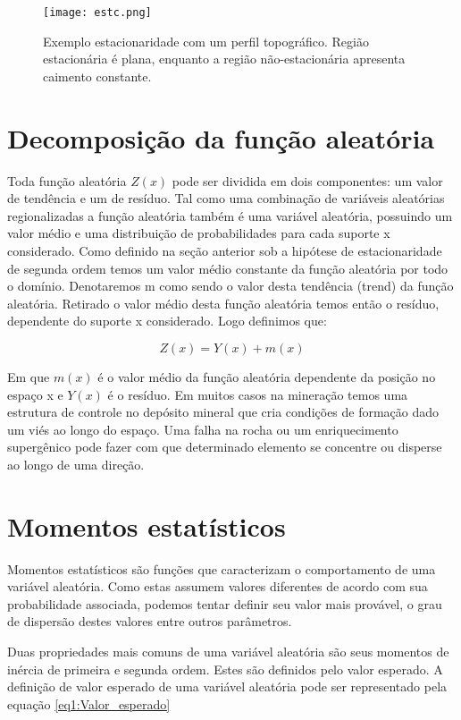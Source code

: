 \begin{figure}
\centering
\texttt{[image: estc.png]}	
\caption{Exemplo estacionaridade com um perfil topográfico. Região estacionária é plana, enquanto a região não-estacionária apresenta caimento constante.}
\label{estc}
\end{figure}

\section{Decomposição da função aleatória} \label{residuo}

Toda função aleatória $Z(x)$ pode ser dividida em dois componentes:  um valor de tendência e um de resíduo. Tal como uma combinação de variáveis aleatórias regionalizadas a função aleatória também é uma variável aleatória, possuindo um valor médio e uma distribuição de probabilidades para cada suporte x considerado. Como definido na seção anterior sob a hipótese de estacionaridade de segunda ordem temos um valor médio constante da função aleatória por todo o domínio. Denotaremos m como sendo o valor desta tendência (trend) da função aleatória. Retirado o valor médio desta função aleatória temos então o resíduo, dependente do suporte x considerado. Logo definimos que:

\begin{equation}\label{eq0:Decomposicaovariavel}
Z(x) = Y(x) + m(x)
\end{equation}

Em que $m(x)$ é o valor médio da função aleatória dependente da posição no espaço x e $Y(x)$ é o resíduo. Em muitos casos na mineração temos uma estrutura de controle no depósito mineral que cria condições de formação dado um viés ao longo do espaço. Uma falha na rocha ou um enriquecimento supergênico pode fazer com que determinado elemento se concentre ou disperse ao longo de uma direção. 

\section{Momentos estatísticos}


Momentos estatísticos são funções que caracterizam o comportamento de uma variável aleatória. Como estas assumem valores diferentes de acordo com sua probabilidade associada, podemos tentar definir seu valor mais provável, o grau de dispersão destes valores entre outros parâmetros. 

Duas propriedades mais comuns de uma variável aleatória são seus momentos de inércia de primeira e segunda ordem. Estes são definidos pelo valor esperado. A definição de valor esperado de uma variável aleatória pode ser representado pela equação \eqref{eq1:Valor_esperado} 

